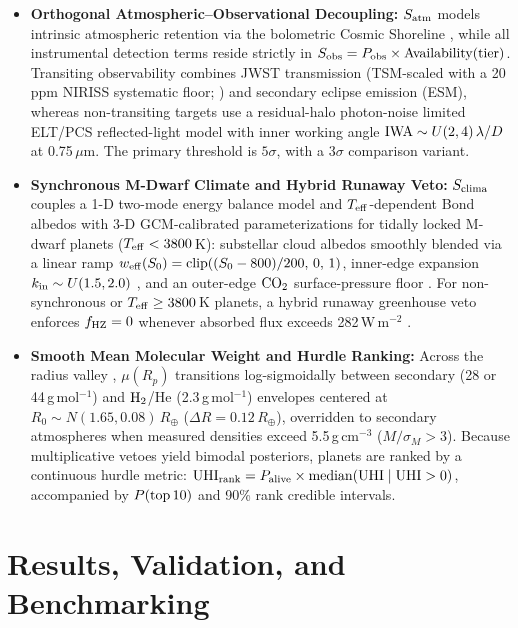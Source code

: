 \documentclass[linenumbers]{aastex702}
\begin{document}
\begin{itemize}
\item \textbf{Orthogonal Atmospheric--Observational Decoupling:} $S_{\rm atm}$ models intrinsic atmospheric retention via the bolometric Cosmic Shoreline \citep{Zahnle2017}, while all instrumental detection terms reside strictly in $S_{\rm obs} = P_{\rm obs} \times {\rm Availability(tier)}$. Transiting observability combines JWST transmission (TSM-scaled with a 20\,ppm NIRISS systematic floor; \citealt{Kempton2018,Greene2016}) and secondary eclipse emission (ESM), whereas non-transiting targets use a residual-halo photon-noise limited ELT/PCS reflected-light model \citep{Kasper2021} with inner working angle ${\rm IWA} \sim U(2, 4)\,\lambda/D$ at 0.75\,$\mu$m. The primary threshold is $5\sigma$, with a $3\sigma$ comparison variant.

\item \textbf{Synchronous M-Dwarf Climate and Hybrid Runaway Veto:} $S_{\rm clima}$ couples a 1-D two-mode energy balance model \citep{North1981} and $T_{\rm eff}$-dependent Bond albedos \citep{Shields2013} with 3-D GCM-calibrated parameterizations for tidally locked M-dwarf planets ($T_{\rm eff} < 3800$\,K): substellar cloud albedos \citep{Yang2013} smoothly blended via a linear ramp $w_{\rm eff}(S_0) = {\rm clip}((S_0 - 800)/200,\, 0,\, 1)$, inner-edge expansion $k_{\rm in} \sim U(1.5, 2.0)$ \citep{Kopparapu2016}, and an outer-edge ${\rm CO}_2$ surface-pressure floor \citep{Turbet2018}. For non-synchronous or $T_{\rm eff} \geq 3800$\,K planets, a hybrid runaway greenhouse veto enforces $f_{\rm HZ} = 0$ whenever absorbed flux exceeds 282\,W\,m$^{-2}$ \citep{Goldblatt2013,Goldblatt2014}.

\item \textbf{Smooth Mean Molecular Weight and Hurdle Ranking:} Across the radius valley \citep{Fulton2017}, $\mu(R_p)$ transitions log-sigmoidally between secondary (28 or 44\,g\,mol$^{-1}$) and ${\rm H}_2$/He (2.3\,g\,mol$^{-1}$) envelopes centered at $R_0 \sim N(1.65, 0.08)\,R_\oplus$ ($\Delta R = 0.12\,R_\oplus$), overridden to secondary atmospheres when measured densities exceed 5.5\,g\,cm$^{-3}$ ($M/\sigma_M > 3$). Because multiplicative vetoes yield bimodal posteriors, planets are ranked by a continuous hurdle metric: ${\rm UHI}_{\rm rank} = P_{\rm alive} \times {\rm median}({\rm UHI}\mid {\rm UHI} > 0)$, accompanied by $P({\rm top\,10})$ and 90\% rank credible intervals.
\end{itemize}

\section{Results, Validation, and Benchmarking}
\end{document}
